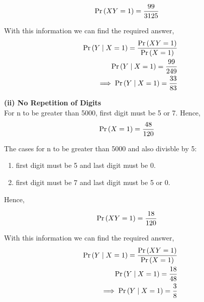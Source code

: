 \documentclass{article}
\begin{document}
\begin{align}
	\Pr\left(XY=1\right) &=\frac{99}{3125}
\end{align}

With this information we can find the required answer,
\begin{align}
	\Pr\left(Y \mid X=1\right)=\frac{\Pr\left(XY=1\right) }{\Pr\left(X=1\right)}\\
	\Pr\left(Y \mid X=1\right)=\frac{99}{249}\\	
	\implies \Pr\left(Y \mid X=1\right)=\frac{33}{83}	
\end{align}


\textbf{(ii) No Repetition of Digits}\\
For n to be greater than 5000, first digit must be 5 or 7. Hence,
\begin{align}
	\Pr\left(X=1\right) &=\frac{48}{120}
\end{align}

The cases for n to be greater than 5000 and also divisble by 5:
\begin{enumerate}
\item first digit must be 5 and last digit must be 0.
\item first digit must be 7 and last digit must be 5 or 0.
\end{enumerate}
Hence,

\begin{align}
	\Pr\left(XY=1\right) &=\frac{18}{120}
\end{align}

With this information we can find the required answer,
\begin{align}
	\Pr\left(Y \mid X=1\right)=\frac{\Pr\left(XY=1\right) }{\Pr\left(X=1\right)}\\
	\Pr\left(Y \mid X=1\right)=\frac{18}{48}\\	
	\implies \Pr\left(Y \mid X=1\right)=\frac{3}{8}	
\end{align}
\end{document}
